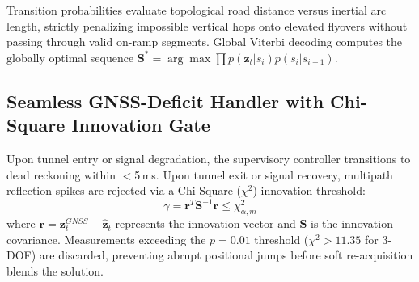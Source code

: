 Transition probabilities evaluate topological road distance versus inertial arc length, strictly penalizing impossible vertical hops onto elevated flyovers without passing through valid on-ramp segments. Global Viterbi decoding computes the globally optimal sequence $\mathbf{S}^* = \arg\max \prod p(\mathbf{z}_t|s_i)p(s_i|s_{i-1})$.

\subsection{Seamless GNSS-Deficit Handler with Chi-Square Innovation Gate}

Upon tunnel entry or signal degradation, the supervisory controller transitions to dead reckoning within $<$5\,ms. Upon tunnel exit or signal recovery, multipath reflection spikes are rejected via a Chi-Square ($\chi^2$) innovation threshold:
\begin{equation}
\gamma = \mathbf{r}^T\mathbf{S}^{-1}\mathbf{r} \leq \chi^2_{\alpha,m}
\end{equation}
where $\mathbf{r} = \mathbf{z}_t^{GNSS} - \hat{\mathbf{z}}_t$ represents the innovation vector and $\mathbf{S}$ is the innovation covariance. Measurements exceeding the $p=0.01$ threshold ($\chi^2 > 11.35$ for 3-DOF) are discarded, preventing abrupt positional jumps before soft re-acquisition blends the solution.

